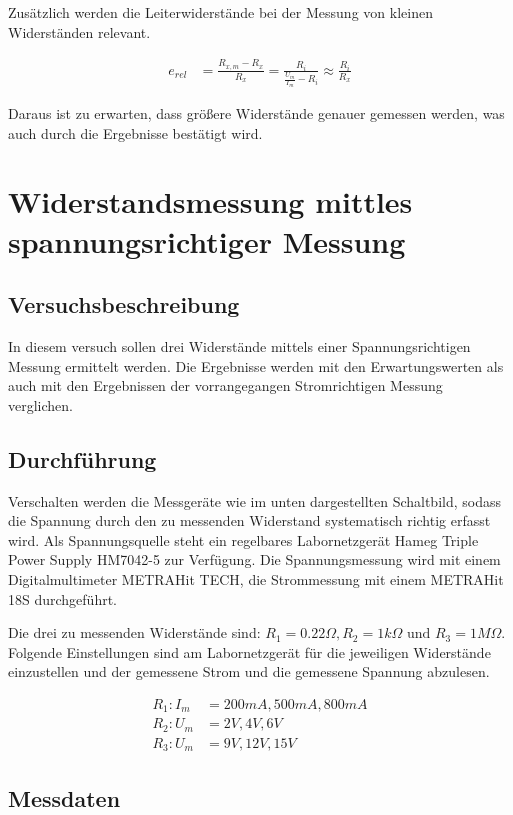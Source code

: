 \documentclass[a4paper, 11pt]{report}
\begin{document}
Zusätzlich werden die Leiterwiderstände bei der Messung von kleinen Widerständen relevant.

\begin{align}
    e_{rel} &= \frac{R_{x,m} - R_x}{R_x} = \frac{R_i}{\frac{U_m}{I_m} - R_i} \approx \frac{R_i}{R_x}
\end{align}

Daraus ist zu erwarten, dass größere Widerstände genauer gemessen werden, was auch durch die Ergebnisse bestätigt wird.

\section[Spannungsrichtige Messung]{Widerstandsmessung mittles spannungsrichtiger Messung}
\subsection{Versuchsbeschreibung}
In diesem versuch sollen drei Widerstände mittels einer Spannungsrichtigen Messung ermittelt werden. Die Ergebnisse werden mit den Erwartungswerten als auch mit den Ergebnissen der vorrangegangen Stromrichtigen Messung verglichen.

\subsection{Durchführung}
Verschalten werden die Messgeräte wie im unten dargestellten Schaltbild, sodass die Spannung durch den zu messenden Widerstand systematisch richtig erfasst wird. Als Spannungsquelle steht ein regelbares Labornetzgerät Hameg Triple Power Supply HM7042-5 zur Verfügung. Die Spannungsmessung wird mit einem Digitalmultimeter METRAHit TECH, die Strommessung mit einem METRAHit 18S durchgeführt.

Die drei zu messenden Widerstände sind: \(R_1 = 0.22\Omega, R_2 = 1k\Omega \text{ und } R_3 = 1M\Omega\).
Folgende Einstellungen sind am Labornetzgerät für die jeweiligen Widerstände einzustellen und der gemessene Strom und die gemessene Spannung abzulesen.

\[
\begin{aligned}
R_1: I_m &= 200mA, 500mA, 800mA\\
R_2: U_m &= 2V, 4V, 6V\\
R_3: U_m &= 9V, 12V, 15V
\end{aligned}
\]

\subsection{Messdaten}
\end{document}
